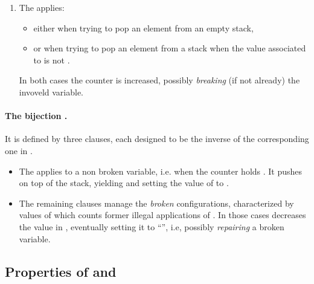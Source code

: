 \begin{enumerate}
In general, the counter  serves as a \emph{flag}. When  exceeds ``'', it distinguishes states where applying  is meaningless from those where  behaves as expected, removing an element from the stack.

\item
The  applies:
\begin{itemize}
\item either when trying to pop an element from an empty stack,
\item or when trying to pop an element from a stack when the value  associated to  is not .
\end{itemize}
In both cases the counter  is increased, possibly \emph{breaking} (if not already) the invoveld variable.
\end{enumerate}

\paragraph{The bijection .}
It is defined by three clauses, each designed to be the inverse of the corresponding one in .

\begin{itemize}
\item
The  applies to a non broken variable, i.e. when the counter  holds . It pushes  on top of the stack, yielding  and setting the value of  to .

\item
The remaining clauses manage the \emph{broken} configurations, characterized by values of  which counts former illegal applications of . In those cases  decreases the value in , eventually setting it to ``'', i.e, possibly \emph{repairing} a broken variable.
\end{itemize}




\subsection{Properties of  and }
\label{subsection:Properties of push and pop}

